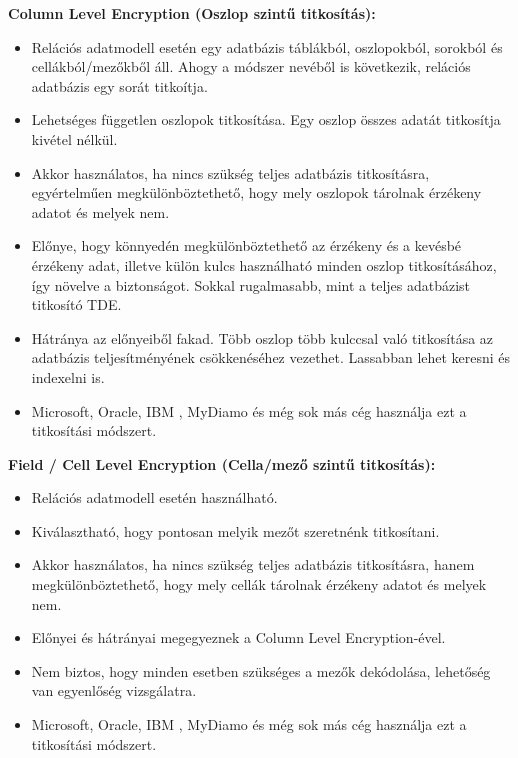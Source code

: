 \vspace{25pt}
\noindent\textbf{Column Level Encryption (Oszlop szintű titkosítás):}\newline
\begin{itemize}
	\item Relációs adatmodell esetén egy adatbázis táblákból, oszlopokból, sorokból és cellákból/mezőkből áll. Ahogy a módszer nevéből is következik, relációs adatbázis egy sorát titkoítja.
	\item Lehetséges független oszlopok titkosítása. Egy oszlop összes adatát titkosítja kivétel nélkül. 
	\item Akkor használatos, ha nincs szükség teljes adatbázis titkosításra, egyértelműen megkülönböztethető, hogy mely oszlopok tárolnak érzékeny adatot és melyek nem.
	\item Előnye, hogy könnyedén megkülönböztethető az érzékeny és a kevésbé érzékeny adat, illetve külön kulcs használható minden oszlop titkosításához, így növelve a biztonságot. Sokkal rugalmasabb, mint a teljes adatbázist titkosító TDE.
	\item Hátránya az előnyeiből fakad. Több oszlop több kulccsal való titkosítása az adatbázis teljesítményének csökkenéséhez vezethet. Lassabban lehet keresni és indexelni is.
	\item Microsoft, Oracle, IBM , MyDiamo és még sok más cég használja ezt a titkosítási módszert.
\end{itemize}

\vspace{25pt}
\noindent\textbf{Field / Cell Level Encryption (Cella/mező szintű titkosítás):}\newline
\begin{itemize}
	\item Relációs adatmodell esetén használható.
	\item Kiválasztható, hogy pontosan melyik mezőt szeretnénk titkosítani. 
	\item Akkor használatos, ha nincs szükség teljes adatbázis titkosításra, hanem megkülönböztethető, hogy mely cellák tárolnak érzékeny adatot és melyek nem.
	\item Előnyei és hátrányai megegyeznek a Column Level Encryption-ével. 
	\item Nem biztos, hogy minden esetben szükséges a mezők dekódolása, lehetőség van egyenlőség vizsgálatra.
	\item Microsoft, Oracle, IBM , MyDiamo és még sok más cég használja ezt a titkosítási módszert.
\end{itemize}

